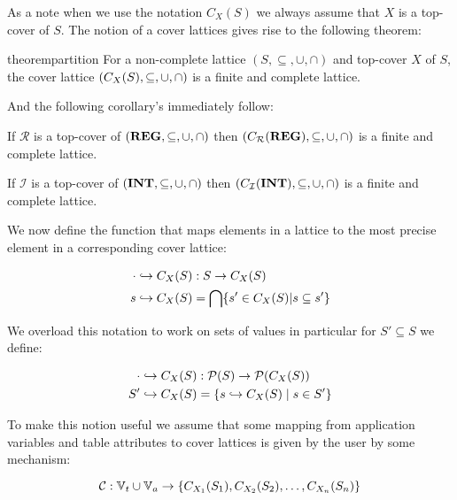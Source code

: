 As a note when we use the notation $C_X(S)$ we always assume that $X$ is a top-cover of $S$.
The notion of a cover lattices gives rise to the following theorem:

\begin{restatable}{theorem}{partition}\label{thm:partition}
For a non-complete lattice $(S, \subseteq, \cup, \cap)$ and top-cover $X$ of $S$, the cover lattice $(C_{X}(S), \subseteq, \cup, \cap)$ is a finite and complete lattice.
\end{restatable}

And the following corollary's immediately follow:

\begin{corollary}\label{co:topcoverr}
    If $\mathcal{R}$ is a top-cover of $(\mathbf{REG}, \subseteq, \cup, \cap)$ then $(C_{\mathcal{R}}(\mathbf{REG}), \subseteq, \cup, \cap)$ is a finite and complete lattice.
\end{corollary}

\begin{corollary}\label{co:topcoveri}
    If $\mathcal{I}$ is a top-cover of $(\mathbf{INT}, \subseteq, \cup, \cap)$ then $(C_{\mathcal{I}}(\mathbf{INT}), \subseteq, \cup, \cap)$ is a finite and complete lattice.
\end{corollary}

We now define the function that maps elements in a lattice to the most precise element in a corresponding cover lattice:

\begin{align}
    \cdot \hookrightarrow C_X(S) &: S\rightarrow C_X(S) \\
    s \hookrightarrow C_X(S) &= \bigcap\{s' \in C_X(S)|s \subseteq s'\}
\end{align}

We overload this notation to work on sets of values in particular for $S' \subseteq S$ we define:

\begin{align}
    \cdot \hookrightarrow C_X(S) &: \mathcal{P}(S) \rightarrow \mathcal{P}(C_X(S)) \\
    S' \hookrightarrow C_X (S) &= \{s \hookrightarrow C_X(S) \mid s \in S'\}
\end{align}

To make this notion useful we assume that some mapping from application variables and table attributes to cover lattices is given by the user by some mechanism:

\begin{equation}\label{eq:lookupcl}
    \lookupcl : \mathbb{V}_t \cup \mathbb{V}_a \rightarrow \{ C_{X_1}(S_1), C_{X_2}(S_2), \dots, C_{X_n}(S_n) \}
\end{equation}


